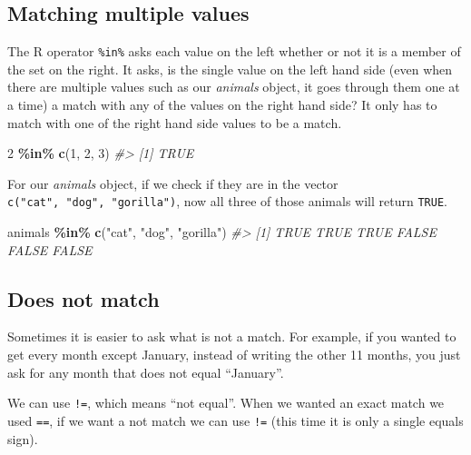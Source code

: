 \documentclass[
  12pt,
]{book}
\newenvironment{Shaded}{\begin{snugshade}}{\end{snugshade}}
\newcommand{\CommentTok}[1]{\textcolor[rgb]{0.37,0.37,0.37}{\textit{#1}}}
\newcommand{\DecValTok}[1]{\textcolor[rgb]{0.06,0.06,0.06}{#1}}
\newcommand{\KeywordTok}[1]{\textcolor[rgb]{0.27,0.27,0.27}{\textbf{#1}}}
\newcommand{\NormalTok}[1]{#1}
\newcommand{\OperatorTok}[1]{\textcolor[rgb]{0.43,0.43,0.43}{\textbf{#1}}}
\newcommand{\StringTok}[1]{\textcolor[rgb]{0.5,0.5,0.5}{#1}}
\begin{document}
\hypertarget{matching-multiple-values}{%
\subsection{Matching multiple values}\label{matching-multiple-values}}

The R operator \texttt{\%in\%} asks each value on the left whether or not it is a member of the set on the right. It asks, is the single value on the left hand side (even when there are multiple values such as our \emph{animals} object, it goes through them one at a time) a match with any of the values on the right hand side? It only has to match with one of the right hand side values to be a match.

\begin{Shaded}
\begin{Highlighting}[]
\DecValTok{2} \OperatorTok{\%in\%}\StringTok{ }\KeywordTok{c}\NormalTok{(}\DecValTok{1}\NormalTok{, }\DecValTok{2}\NormalTok{, }\DecValTok{3}\NormalTok{) }
\CommentTok{\#> [1] TRUE}
\end{Highlighting}
\end{Shaded}

For our \emph{animals} object, if we check if they are in the vector \texttt{c("cat",\ "dog",\ "gorilla")}, now all three of those animals will return \texttt{TRUE}.

\begin{Shaded}
\begin{Highlighting}[]
\NormalTok{animals }\OperatorTok{\%in\%}\StringTok{ }\KeywordTok{c}\NormalTok{(}\StringTok{"cat"}\NormalTok{, }\StringTok{"dog"}\NormalTok{, }\StringTok{"gorilla"}\NormalTok{)}
\CommentTok{\#> [1]  TRUE  TRUE  TRUE FALSE FALSE FALSE}
\end{Highlighting}
\end{Shaded}

\hypertarget{does-not-match}{%
\subsection{Does not match}\label{does-not-match}}

Sometimes it is easier to ask what is not a match. For example, if you wanted to get every month except January, instead of writing the other 11 months, you just ask for any month that does not equal ``January''.

We can use \texttt{!=}, which means ``not equal''. When we wanted an exact match we used \texttt{==}, if we want a not match we can use \texttt{!=} (this time it is only a single equals sign).
\end{document}
